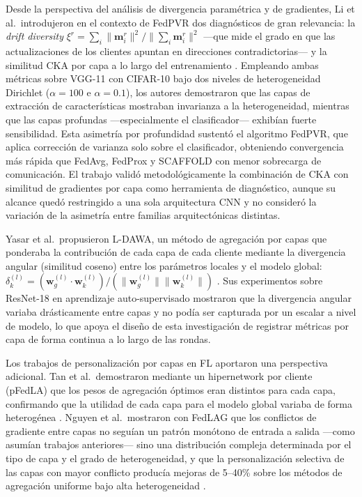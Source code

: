 Desde la perspectiva del análisis de divergencia paramétrica y de gradientes, Li et al.\
introdujeron en el contexto de FedPVR dos diagnósticos de gran relevancia: la
\textit{drift diversity}
$\xi^r = \sum_i \|\mathbf{m}_i^r\|^2 / \|\sum_i \mathbf{m}_i^r\|^2$
---que mide el grado en que las actualizaciones de los clientes apuntan en direcciones
contradictorias--- y la similitud CKA por capa a lo largo del entrenamiento \cite{son2022comparisons}.
Empleando ambas métricas sobre VGG-11 con CIFAR-10 bajo dos niveles de heterogeneidad Dirichlet
($\alpha = 100$ e $\alpha = 0.1$), los autores demostraron que las capas de extracción de
características mostraban invarianza a la heterogeneidad, mientras que las capas profundas
---especialmente el clasificador--- exhibían fuerte sensibilidad.
Esta asimetría por profundidad sustentó el algoritmo FedPVR, que aplica corrección de varianza
solo sobre el clasificador, obteniendo convergencia más rápida que FedAvg, FedProx y SCAFFOLD
con menor sobrecarga de comunicación.
El trabajo validó metodológicamente la combinación de CKA con similitud de gradientes por capa
como herramienta de diagnóstico, aunque su alcance quedó restringido a una sola arquitectura CNN
y no consideró la variación de la asimetría entre familias arquitectónicas distintas.

Yasar et al.\ propusieron L-DAWA, un método de agregación por capas que ponderaba la contribución
de cada capa de cada cliente mediante la divergencia angular (similitud coseno) entre los
parámetros locales y el modelo global: $\delta_k^{(l)} = (\mathbf{w}_g^{(l)} \cdot \mathbf{w}_k^{(l)}) /
(\|\mathbf{w}_g^{(l)}\| \|\mathbf{w}_k^{(l)}\|)$ \cite{son2022comparisons}.
Sus experimentos sobre ResNet-18 en aprendizaje auto-supervisado mostraron que la divergencia
angular variaba drásticamente entre capas y no podía ser capturada por un escalar a nivel de
modelo, lo que apoya el diseño de esta investigación de registrar métricas por capa de forma
continua a lo largo de las rondas.

Los trabajos de personalización por capas en FL aportaron una perspectiva adicional.
Tan et al.\ demostraron mediante un hipernetwork por cliente (pFedLA) que los pesos de agregación
óptimos eran distintos para cada capa, confirmando que la utilidad de cada capa para el modelo
global variaba de forma heterogénea \cite{son2022comparisons}.
Nguyen et al.\ mostraron con FedLAG que los conflictos de gradiente entre capas no seguían un
patrón monótono de entrada a salida ---como asumían trabajos anteriores--- sino una distribución
compleja determinada por el tipo de capa y el grado de heterogeneidad, y que la personalización
selectiva de las capas con mayor conflicto producía mejoras de 5--40\% sobre los métodos de
agregación uniforme bajo alta heterogeneidad \cite{DBLP:journals/corr/abs-1910-06378}.

